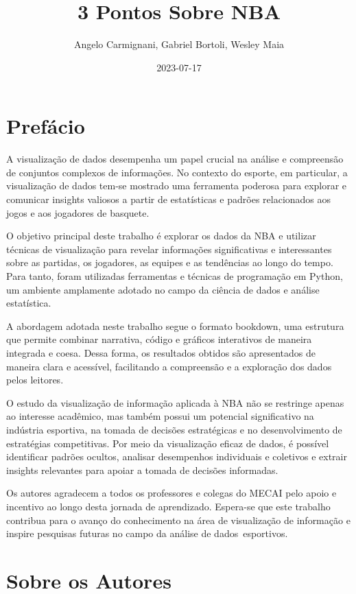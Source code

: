 \documentclass[
]{book}
\title{3 Pontos Sobre NBA}
\author{Angelo Carmignani, Gabriel Bortoli, Wesley Maia}
\date{2023-07-17}
\begin{document}
\maketitle

{
\setcounter{tocdepth}{1}
\tableofcontents
}
\hypertarget{prefuxe1cio}{%
\chapter*{Prefácio}\label{prefuxe1cio}}

A visualização de dados desempenha um papel crucial na análise e compreensão de conjuntos complexos de informações. No contexto do esporte, em particular, a visualização de dados tem-se mostrado uma ferramenta poderosa para explorar e comunicar insights valiosos a partir de estatísticas e padrões relacionados aos jogos e aos jogadores de basquete.

O objetivo principal deste trabalho é explorar os dados da NBA e utilizar técnicas de visualização para revelar informações significativas e interessantes sobre as partidas, os jogadores, as equipes e as tendências ao longo do tempo. Para tanto, foram utilizadas ferramentas e técnicas de programação em Python, um ambiente amplamente adotado no campo da ciência de dados e análise estatística.

A abordagem adotada neste trabalho segue o formato bookdown, uma estrutura que permite combinar narrativa, código e gráficos interativos de maneira integrada e coesa. Dessa forma, os resultados obtidos são apresentados de maneira clara e acessível, facilitando a compreensão e a exploração dos dados pelos leitores.

O estudo da visualização de informação aplicada à NBA não se restringe apenas ao interesse acadêmico, mas também possui um potencial significativo na indústria esportiva, na tomada de decisões estratégicas e no desenvolvimento de estratégias competitivas. Por meio da visualização eficaz de dados, é possível identificar padrões ocultos, analisar desempenhos individuais e coletivos e extrair insights relevantes para apoiar a tomada de decisões informadas.

Os autores agradecem a todos os professores e colegas do MECAI pelo apoio e incentivo ao longo desta jornada de aprendizado. Espera-se que este trabalho contribua para o avanço do conhecimento na área de visualização de informação e inspire pesquisas futuras no campo da análise de dados~esportivos.

\hypertarget{author}{%
\chapter*{Sobre os Autores}\label{author}}
\end{document}

